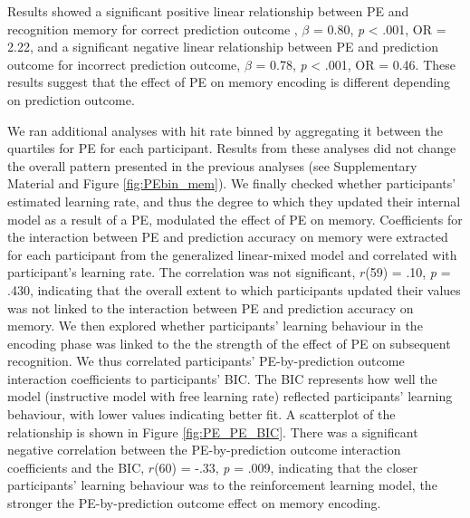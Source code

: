 \documentclass[a4paper,12pt]{article}
\begin{document}
\pagestyle{plain}



 Results showed a significant positive linear relationship between PE and recognition memory for correct prediction outcome , $\beta$ = 0.80, \textit{p} < .001, OR = 2.22, and a significant negative linear relationship between PE and prediction outcome for incorrect prediction outcome, $\beta$ = 0.78, \textit{p} < .001, OR = 0.46.
These results suggest that the effect of PE on memory encoding is different depending on prediction outcome. \par

We ran additional analyses with hit rate binned by aggregating it between the quartiles for PE for each participant. Results from these analyses did not change the overall pattern presented in the previous analyses (see Supplementary Material and Figure \ref{fig:PEbin_mem}). We finally checked whether participants' estimated learning rate, and thus the  degree to which they updated their internal model as a result of a PE, modulated the effect of PE on memory. Coefficients for the interaction between PE and prediction accuracy on memory were extracted for each participant from the generalized linear-mixed model and correlated with participant's learning rate. The correlation was not significant,  $r$(59) = .10, \textit{p} = .430, indicating that the overall extent to which participants updated their values was not linked to the interaction between PE and prediction accuracy on memory. We then explored whether participants' learning behaviour in the encoding phase was linked to the the strength of the effect of PE on subsequent recognition. We thus correlated participants' PE-by-prediction outcome interaction coefficients to participants' BIC. The BIC represents how well the model (instructive model with free learning rate) reflected participants' learning behaviour, with lower values indicating better fit. A scatterplot of the relationship is shown in Figure \ref{fig:PE_PE_BIC}.
There was a significant negative correlation between the PE-by-prediction outcome interaction coefficients and the BIC,  $r$(60) = -.33, \textit{p} = .009, indicating that the closer participants' learning behaviour was to the reinforcement learning model, the stronger the PE-by-prediction outcome effect on memory encoding.
 
\end{document}
